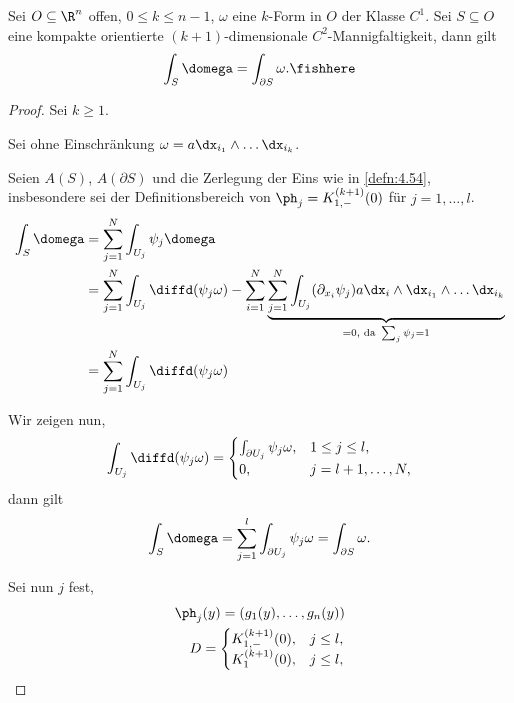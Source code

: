 \begin{prop}
\label{prop:4.55}
Sei $O\subseteq\R^n$ offen, $0\le k\le n-1$, $\omega$ eine $k$-Form in $O$ der
Klasse $C^1$. Sei $S\subseteq O$ eine kompakte orientierte $(k+1)$-dimensionale
$C^2$-Mannigfaltigkeit, dann gilt
\begin{align*}
\int_S \domega = \int_{\partial S}\omega.\fishhere
\end{align*}
\end{prop}
\begin{proof}
Sei $k\ge 1$.
\begin{bemn}[Vereinfachung.]
Sei ohne Einschränkung $\omega = a \dx_{i_1}\land \ldots\dx_{i_k}$.
\end{bemn}
\begin{bemn}[Lokalisierung.]
Seien $A(S)$, $A(\partial S)$ und die Zerlegung der Eins wie in
\ref{defn:4.54}, insbesondere sei der Definitionsbereich von $\ph_j =
K_{1,-}^{(k+1)}(0)$ für $j=1,\ldots,l$.
\begin{align*}
\int_S \domega &= \sum\limits_{j=1}^N \int_{U_j} \psi_j \domega
\\ &= \sum\limits_{j=1}^N \int_{U_j}  \diffd(\psi_j\omega) -
\sum\limits_{i=1}^N\underbrace{\sum\limits_{j=1}^N \int_{U_j}
(\partial_{x_i}\psi_j) a \dx_i \land \dx_{i_1}\land \ldots\dx_{i_k}}_{=0,\text{
da }\sum_j \psi_j = 1}\\
&= \sum\limits_{j=1}^N \int_{U_j}  \diffd(\psi_j\omega)
\end{align*}
\end{bemn}
\begin{bemn}[Spezialfall.]
Wir zeigen nun,
\begin{align*}
\int_{U_j} \diffd(\psi_j\omega) = \begin{cases}
\int_{\partial U_j} \psi_j\omega,& 1\le j\le l,\\
0, & j = l+1,\ldots,N,
\end{cases}
\end{align*}
dann gilt
\begin{align*}
\int_S \domega = \sum\limits_{j=1}^l \int_{\partial U_j} \psi_j \omega =
\int_{\partial S} \omega.
\end{align*}
\end{bemn}
Sei nun $j$ fest,
\begin{align*}
\ph_j(y) = (g_1(y),\ldots,g_n(y))\\
D = \begin{cases}
K_{1,-}^{(k+1)}(0),& j\le l,\\
K_{1}^{(k+1)}(0),& j\le l,
\end{cases}
\end{align*}


\end{proof}
